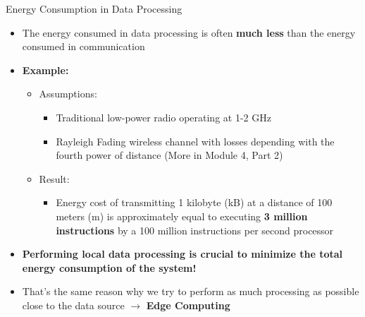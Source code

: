 \documentclass[aspectratio=169,11pt]{beamer}
\begin{document}
\begin{frame}{Energy Consumption in Data Processing}
    \begin{itemize}
        \item The energy consumed in data processing is often \textbf{much less} than the energy consumed in communication
        \item \textbf{Example:}
        \begin{itemize}
            \item Assumptions:
            \begin{itemize}
                \item Traditional low-power radio operating at 1-2 GHz
                \item Rayleigh Fading wireless channel with losses depending with the fourth power of distance (More in Module 4, Part 2)
            \end{itemize}
            \item Result:
            \begin{itemize}
                \item Energy cost of transmitting 1 kilobyte (kB) at a distance of 100 meters (m) is approximately equal to executing \textbf{3 million instructions} by a 100 million instructions per second processor
            \end{itemize}
        \end{itemize}
        \item \textbf{Performing local data processing is crucial to minimize the total energy consumption of the system!}
        \item That's the same reason why we try to perform as much processing as possible close to the data source $\rightarrow$ \textbf{Edge Computing}
    \end{itemize}
\end{frame}
\end{document}
